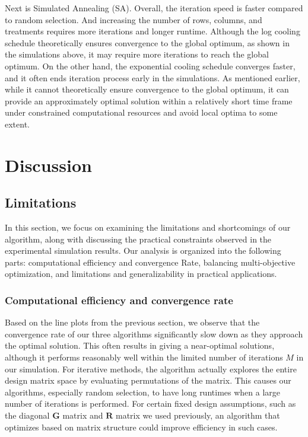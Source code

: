 \documentclass[
  a4paper,
  oneside,
  openany,
  12pt,
  onecolumn]{book}
\theoremstyle{plain}
\theoremstyle{definition}
\theoremstyle{remark}
\begin{document}
Next is Simulated Annealing (SA). Overall, the iteration speed is faster
compared to random selection. And increasing the number of rows,
columns, and treatments requires more iterations and longer runtime.
Although the log cooling schedule theoretically ensures convergence to
the global optimum, as shown in the simulations above, it may require
more iterations to reach the global optimum. On the other hand, the
exponential cooling schedule converges faster, and it often ends
iteration process early in the simulations. As mentioned earlier, while
it cannot theoretically ensure convergence to the global optimum, it can
provide an approximately optimal solution within a relatively short time
frame under constrained computational resources and avoid local optima
to some extent.


\chapter{Discussion}\label{sec-discuss}

\section{Limitations}\label{limitations}

In this section, we focus on examining the limitations and shortcomings
of our algorithm, along with discussing the practical constraints
observed in the experimental simulation results. Our analysis is
organized into the following parts: computational efficiency and
convergence Rate, balancing multi-objective optimization, and
limitations and generalizability in practical applications.

\subsection{Computational efficiency and convergence
rate}\label{computational-efficiency-and-convergence-rate}

Based on the line plots from the previous section, we observe that the
convergence rate of our three algorithms significantly slow down as they
approach the optimal solution. This often results in giving a
near-optimal solutions, although it performs reasonably well within the
limited number of iterations \(M\) in our simulation. For iterative
methods, the algorithm actually explores the entire design matrix space
by evaluating permutations of the matrix. This causes our algorithms,
especially random selection, to have long runtimes when a large number
of iterations is performed. For certain fixed design assumptions, such
as the diagonal \(\boldsymbol{G}\) matrix and \(\boldsymbol{R}\) matrix
we used previously, an algorithm that optimizes based on matrix
structure could improve efficiency in such cases.
\end{document}
